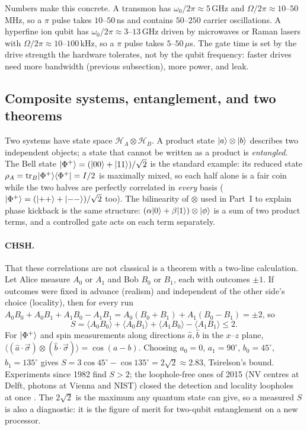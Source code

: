 Numbers make this concrete. A transmon has $\omega_0/2\pi\approx5$\,GHz and
$\Omega/2\pi\approx10$--$50$\,MHz, so a $\pi$ pulse takes $10$--$50$\,ns and contains $50$--$250$
carrier oscillations. A hyperfine ion qubit has $\omega_0/2\pi\approx3$--$13$\,GHz driven by
microwaves or Raman lasers with $\Omega/2\pi\approx10$--$100$\,kHz, so a $\pi$ pulse takes
$5$--$50\,\mu$s. The gate time is set by the drive strength the hardware tolerates, not by the
qubit frequency: faster drives need more bandwidth (previous subsection), more power, and leak.

\subsection{Composite systems, entanglement, and two theorems}\label{ph:sec:ent}

Two systems have state space $\mathcal H_A\otimes\mathcal H_B$. A product state
$\lvert a \rangle\otimes\lvert b \rangle$ describes two independent objects; a state that cannot be written as a
product is \emph{entangled}. The Bell state $\lvert \Phi^+ \rangle=(\lvert 00 \rangle+\lvert 11 \rangle)/\sqrt2$ is the
standard example: its reduced state $\rho_A=\operatorname{tr}_B\lvert \Phi^+ \rangle\langle \Phi^+ \rvert=I/2$ is
maximally mixed, so each half alone is a fair coin while the two halves are perfectly correlated
in \emph{every} basis ($\lvert \Phi^+ \rangle=(\lvert ++ \rangle+\lvert -- \rangle)/\sqrt2$ too). The bilinearity of
$\otimes$ used in Part~I to explain phase kickback is the same structure: $(\alpha\lvert 0 \rangle+\beta\lvert 1 \rangle)\otimes\lvert \phi \rangle$
is a sum of two product terms, and a controlled gate acts on each term separately.

\paragraph{CHSH.} That these correlations are not classical is a theorem with a two-line
calculation. Let Alice measure $A_0$ or $A_1$ and Bob $B_0$ or $B_1$, each with outcomes $\pm1$.
If outcomes were fixed in advance (realism) and independent of the other side's choice
(locality), then for every run $A_0B_0+A_0B_1+A_1B_0-A_1B_1=A_0(B_0+B_1)+A_1(B_0-B_1)=\pm2$, so
\[ S=\langle A_0B_0\rangle+\langle A_0B_1\rangle+\langle A_1B_0\rangle-\langle A_1B_1\rangle\le2 . \]
For $\lvert \Phi^+ \rangle$ and spin measurements along directions $\hat a,\hat b$ in the $x$--$z$ plane,
$\langle(\hat a\cdot\vec\sigma)\otimes(\hat b\cdot\vec\sigma)\rangle=\cos(a-b)$. Choosing
$a_0=0$, $a_1=90^\circ$, $b_0=45^\circ$, $b_1=135^\circ$ gives
$S=3\cos45^\circ-\cos135^\circ=2\sqrt2\approx2.83$, Tsirelson's bound. Experiments since 1982
find $S>2$; the loophole-free ones of 2015 (NV centres at Delft, photons at Vienna and NIST)
closed the detection and locality loopholes at once \cite{ph:uqt26}. The $2\sqrt2$ is the
maximum any quantum state can give, so a measured $S$ is also a diagnostic: it is the figure of
merit for two-qubit entanglement on a new processor.

